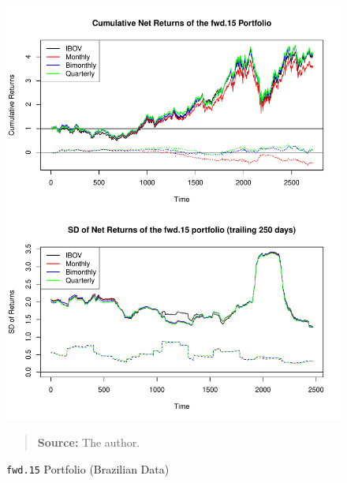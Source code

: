 \documentclass[preprint, doubleblind, authoryear,10pt]{elsarticle}
\begin{document}
\begin{figure}[htpb]
\centering
\footnotesize
\caption{\texttt{fwd.15} Portfolio (Brazilian Data)}
\label{fig:ibov:fwd.15}
\includegraphics[width=.95\linewidth]{./figs/IBOV-retac-fwd-15.pdf}
\begin{quote}
\textbf{Source:} The author.
\end{quote}
\end{figure}
\end{document}
